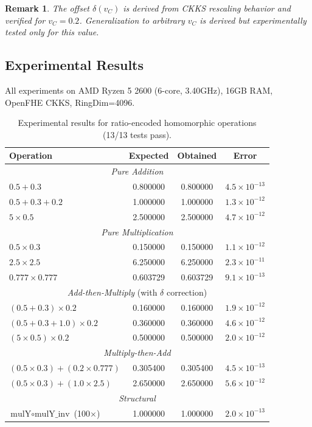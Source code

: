 \documentclass[11pt,a4paper]{article}
\newtheorem{remark}[theorem]{Remark}
\begin{document}
\begin{remark}
The offset $\delta(v_C)$ is derived from CKKS rescaling behavior and verified for $v_C = 0.2$. Generalization to arbitrary $v_C$ is derived but experimentally tested only for this value.
\end{remark}

\subsection{Experimental Results}

All experiments on AMD Ryzen 5 2600 (6-core, 3.40GHz), 16GB RAM, OpenFHE CKKS, RingDim=4096.

\begin{table}[h]
\centering
\begin{tabular}{lccc}
\toprule
\textbf{Operation} & \textbf{Expected} & \textbf{Obtained} & \textbf{Error} \\
\midrule
\multicolumn{4}{c}{\textit{Pure Addition}} \\
$0.5 + 0.3$ & 0.800000 & 0.800000 & $4.5\times10^{-13}$ \\
$0.5 + 0.3 + 0.2$ & 1.000000 & 1.000000 & $1.3\times10^{-12}$ \\
$5 \times 0.5$ & 2.500000 & 2.500000 & $4.7\times10^{-12}$ \\
\midrule
\multicolumn{4}{c}{\textit{Pure Multiplication}} \\
$0.5 \times 0.3$ & 0.150000 & 0.150000 & $1.1\times10^{-12}$ \\
$2.5 \times 2.5$ & 6.250000 & 6.250000 & $2.3\times10^{-11}$ \\
$0.777 \times 0.777$ & 0.603729 & 0.603729 & $9.1\times10^{-13}$ \\
\midrule
\multicolumn{4}{c}{\textit{Add-then-Multiply} (with $\delta$ correction)} \\
$(0.5+0.3) \times 0.2$ & 0.160000 & 0.160000 & $1.9\times10^{-12}$ \\
$(0.5+0.3+1.0) \times 0.2$ & 0.360000 & 0.360000 & $4.6\times10^{-12}$ \\
$(5\times0.5) \times 0.2$ & 0.500000 & 0.500000 & $2.0\times10^{-12}$ \\
\midrule
\multicolumn{4}{c}{\textit{Multiply-then-Add}} \\
$(0.5\times0.3)+(0.2\times0.777)$ & 0.305400 & 0.305400 & $4.5\times10^{-13}$ \\
$(0.5\times0.3)+(1.0\times2.5)$ & 2.650000 & 2.650000 & $5.6\times10^{-12}$ \\
\midrule
\multicolumn{4}{c}{\textit{Structural}} \\
$\text{mulY} \circ \text{mulY\_inv}$ (100$\times$) & 1.000000 & 1.000000 & $2.0\times10^{-13}$ \\
\bottomrule
\end{tabular}
\caption{Experimental results for ratio-encoded homomorphic operations (13/13 tests pass).}
\end{table}
\end{document}
